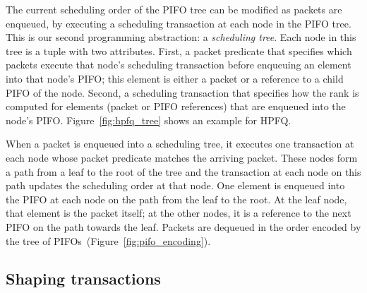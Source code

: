 The current scheduling order of the PIFO tree can be modified as packets are
enqueued, by executing a scheduling transaction at each node in the PIFO tree.
This is our second programming abstraction: a {\em scheduling tree}.  Each node
in this tree is a tuple with two attributes. First, a packet predicate that
specifies which packets execute that node's scheduling transaction before
enqueuing an element into that node's PIFO; this element is either a packet or
a reference to a child PIFO of the node.  Second, a scheduling transaction that
specifies how the rank is computed for elements (packet or PIFO references)
that are enqueued into the node's PIFO. Figure~\ref{fig:hpfq_tree} shows an
example for HPFQ.

When a packet is enqueued into a scheduling tree, it executes one transaction
at each node whose packet predicate matches the arriving packet. These nodes
form a path from a leaf to the root of the tree and the transaction at each
node on this path updates the scheduling order at that node. One element is
enqueued into the PIFO at each node on the path from the leaf to the root. At
the leaf node, that element is the packet itself; at the other nodes, it is a
reference to the next PIFO on the path towards the leaf. Packets are dequeued
in the order encoded by the tree of PIFOs~(Figure~\ref{fig:pifo_encoding}).

\subsection{Shaping transactions}
\label{ss:hshaping}

